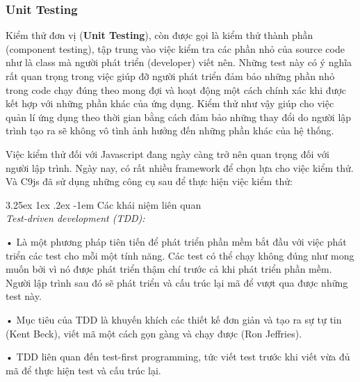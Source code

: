 \documentclass[12pt,a4paper]{article}
\makeatletter
\let\newcounter\@gobble\let\setcounter\@gobbletwo
\newcommand{\myparagraph}[1]{\paragraph{#1}\mbox{}\\} %
\newcounter{subsubsubsection}[subsubsection]
\renewcommand\paragraph{\@startsection{paragraph}{5}{\z@}%
  {3.25ex \@plus1ex \@minus.2ex}%
  {-1em}%
  {\normalfont\normalsize\bfseries}}
\makeatother
\begin{document}
\subsubsection{Unit Testing}
Kiểm thử đơn vị (\textbf{Unit Testing}), còn được gọi là kiểm thử thành phần (component testing), tập trung vào việc kiểm tra các phần nhỏ của source code như là class mà người phát triển (developer) viết nên. Những test này có ý nghĩa rất quan trọng trong việc giúp đỡ người phát triển đảm bảo những phần nhỏ trong code chạy đúng theo mong đợi và hoạt động một cách chính xác khi được kết hợp với những phần khác của ứng dụng. Kiểm thử như vậy giúp cho việc quản lí ứng dụng theo thời gian bằng cách đảm bảo những thay đổi do người lập trình tạo ra sẽ không vô tình ảnh hưởng đến những phần khác của hệ thống.

Việc kiểm thử đối với Javascript đang ngày càng trở nên quan trọng đối với người lập trình. Ngày nay, có rất nhiều framework để chọn lựa cho việc kiểm thử. Và C9js đã sử dụng những công cụ sau để thực hiện việc kiểm thử:

\myparagraph{Các khái niệm liên quan}

\textit{Test-driven development (TDD):}
\begin{list}{}{}
\item[•] Là một phương pháp tiên tiến để phát triển phần mềm bắt đầu với việc phát triển các test cho mỗi một tính năng. Các test có thể chạy không đúng như mong muốn bởi vì nó được phát triển thậm chí trước cả khi phát triển phần mềm. Người lập trình sau đó sẽ phát triển và cấu trúc lại mã để vượt qua được những test này. 
\item[•] Mục tiêu của TDD là khuyến khích các thiết kế đơn giản và tạo ra sự tự tin (Kent Beck), viết mã một cách gọn gàng và chạy được (Ron Jeffries).
\item[•] TDD liên quan đến test-first programming, tức viết test trước khi viết vừa đủ mã để thực hiện test và cấu trúc lại.
\end{list}
\end{document}
